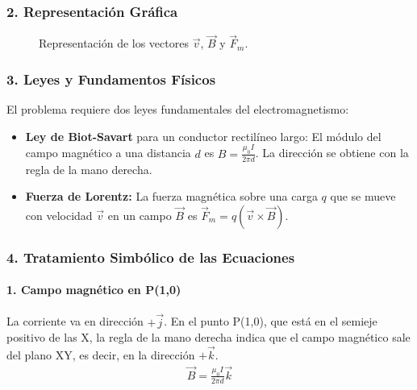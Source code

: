 \subsubsection*{2. Representación Gráfica}
\begin{figure}[H]
    \centering
    \caption{Representación de los vectores $\vec{v}$, $\vec{B}$ y $\vec{F}_m$.}
\end{figure}

\subsubsection*{3. Leyes y Fundamentos Físicos}
El problema requiere dos leyes fundamentales del electromagnetismo:
\begin{itemize}
    \item \textbf{Ley de Biot-Savart} para un conductor rectilíneo largo: El módulo del campo magnético a una distancia $d$ es $B = \frac{\mu_0 I}{2\pi d}$. La dirección se obtiene con la regla de la mano derecha.
    \item \textbf{Fuerza de Lorentz:} La fuerza magnética sobre una carga $q$ que se mueve con velocidad $\vec{v}$ en un campo $\vec{B}$ es $\vec{F}_m = q(\vec{v} \times \vec{B})$.
\end{itemize}

\subsubsection*{4. Tratamiento Simbólico de las Ecuaciones}
\paragraph*{1. Campo magnético en P(1,0)}
La corriente va en dirección $+\vec{j}$. En el punto P(1,0), que está en el semieje positivo de las X, la regla de la mano derecha indica que el campo magnético sale del plano XY, es decir, en la dirección $+\vec{k}$.
\begin{gather}
    \vec{B} = \frac{\mu_0 I}{2\pi d} \vec{k}
\end{gather}
